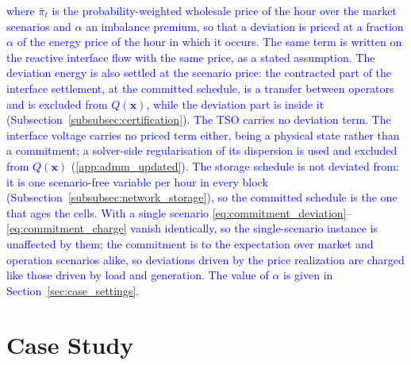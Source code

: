 \documentclass[preprint,12pt]{elsarticle}
\begin{document}
\noindent
\textcolor{blue}{
    where $\bar{\pi}_t$ is the probability-weighted wholesale price of the hour over the market scenarios and $\alpha$ an imbalance premium, so that a deviation is priced at a fraction $\alpha$ of the energy price of the hour in which it occurs. The same term is written on the reactive interface flow with the same price, as a stated assumption. 
    The deviation energy is also settled at the scenario price: the contracted part of the interface settlement, at the committed schedule, is a transfer between operators and is excluded from $Q(\boldsymbol{x})$, while the deviation part is inside it (Subsection~\ref{subsubsec:certification}). The TSO carries no deviation term. The interface voltage carries no priced term either, being a physical state rather than a commitment; a solver-side regularisation of its dispersion is used and excluded from $Q(\boldsymbol{x})$ (\ref{app:admm_updated}).
    The storage schedule is not deviated from: it is one scenario-free variable per hour in every block (Subsection~\ref{subsubsec:network_storage}), so the committed schedule is the one that ages the cells. With a single scenario \eqref{eq:commitment_deviation}--\eqref{eq:commitment_charge} vanish identically, so the single-scenario instance is unaffected by them; the commitment is to the expectation over market and operation scenarios alike, so deviations driven by the price realization are charged like those driven by load and generation.
    The value of $\alpha$ is given in Section~\ref{sec:case_settings}.
}

\section{Case Study}
\label{sec:case_studies}
\end{document}

